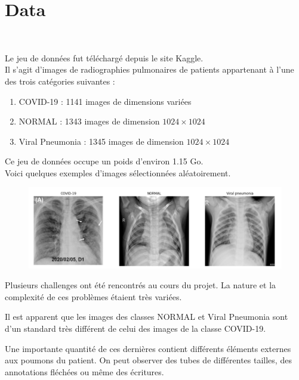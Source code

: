 \documentclass{article}
\begin{document}
	\section*{Data}
	
	~
	\par Le jeu de données fut téléchargé depuis le site Kaggle.\\
	Il s'agit d'images de radiographies pulmonaires de patients appartenant à l'une des trois catégories suivantes :
	
	\begin{enumerate}
	
		\item COVID-19 : 1141 images de dimensions variées
		\item NORMAL : 1343 images de dimension $1024 \times 1024$
		\item Viral Pneumonia : 1345 images de dimension $1024 \times 1024$
		
	\end{enumerate}
	
	\par Ce jeu de données occupe un poids d'environ 1.15 Go.\\
	Voici quelques exemples d'images sélectionnées aléatoirement.
	
	\begin{figure}[!h] 
    \center 
    \includegraphics[scale=0.3]{exemples_img.png} 
	\end{figure}
	
	\par Plusieurs challenges ont été rencontrés au cours du projet. La nature et la complexité de ces problèmes étaient très variées.
	
	\par Il est apparent que les images des classes NORMAL et Viral Pneumonia sont d'un standard très différent de celui des images de la classe COVID-19.
	\par Une importante quantité de ces dernières contient différents éléments externes aux poumons du patient. On peut observer des tubes de différentes tailles, des annotations fléchées ou même des écritures.
	
\end{document}
